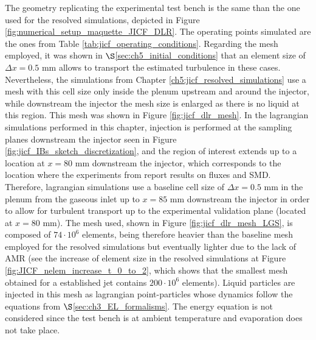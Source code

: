 The geometry replicating the experimental test bench is the same than the one used for the resolved simulations, depicted in Figure \ref{fig:numerical_setup_maquette_JICF_DLR}. The operating points simulated are the ones from Table \ref{tab:jicf_operating_conditions}. Regarding the mesh employed, it was shown in $\S$\ref{sec:ch5_initial_conditions} that an element size of $\Delta x = 0.5$ mm allows to transport the estimated turbulence in these cases. Nevertheless, the simulations from Chapter \ref{ch5:jicf_resolved_simulations} use a mesh with this cell size only inside the plenum upstream and around the injector, while downstream the injector the mesh size is enlarged as there is no liquid at this region. This mesh was shown in Figure \ref{fig:jicf_dlr_mesh}. In the lagrangian simulations performed in this chapter, injection is performed at the sampling planes downstream the injector seen in Figure \ref{fig:jicf_IBs_sketch_discretization}, and the region of interest extends up to a location at $x = 80$ mm downstream the injector, which corresponds to the location where the experiments from  report results on fluxes and SMD. Therefore, lagrangian simulations use a baseline cell size of $\Delta x = 0.5$ mm in the plenum from the gaseous inlet up to $x = 85$ mm downstream the injector in order to allow for turbulent transport up to the experimental validation plane (located at $x = 80$ mm). The mesh used, shown in Figure \ref{fig:jicf_dlr_mesh_LGS}, is composed of $74 \cdot 10^6$ elements, being therefore heavier than the baseline mesh employed for the resolved simulations but eventually lighter due to the lack of AMR (see the increase of element size in the resolved simulations at Figure \ref{fig:JICF_nelem_increase_t_0_to_2}, which shows that the smallest mesh obtained for a established jet contains $200 \cdot 10^6$ elements). Liquid particles are injected in this mesh as lagrangian point-particles whose dynamics follow the equations from  $\S$\ref{sec:ch3_EL_formalisms}. The energy equation is not considered since the test bench is at ambient temperature and evaporation does not take place.

\clearpage


